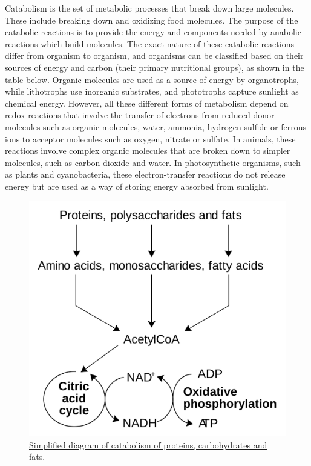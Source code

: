 Catabolism is the set of metabolic processes that break down large molecules. These include breaking down and oxidizing food molecules. The purpose of the catabolic reactions is to provide the energy and components needed by anabolic reactions which build molecules. The exact nature of these catabolic reactions differ from organism to organism, and organisms can be classified based on their sources of energy and carbon (their primary nutritional groups), as shown in the table below. Organic molecules are used as a source of energy by organotrophs, while lithotrophs use inorganic substrates, and phototrophs capture sunlight as chemical energy. However, all these different forms of metabolism depend on redox reactions that involve the transfer of electrons from reduced donor molecules such as organic molecules, water, ammonia, hydrogen sulfide or ferrous ions to acceptor molecules such as oxygen, nitrate or sulfate. In animals, these reactions involve complex organic molecules that are broken down to simpler molecules, such as carbon dioxide and water. In photosynthetic organisms, such as plants and cyanobacteria, these electron-transfer reactions do not release energy but are used as a way of storing energy absorbed from sunlight.



\begin{figure}

{\centering \includegraphics[width=0.7\linewidth]{./figures/bioenergetics/Catabolism_schematic} 

}

\caption{\href{https://commons.wikimedia.org/wiki/File:Catabolism_schematic.svg}{Simplified diagram of catabolism of proteins, carbohydrates and fats.}}\label{fig:simplecatdia}
\end{figure}

